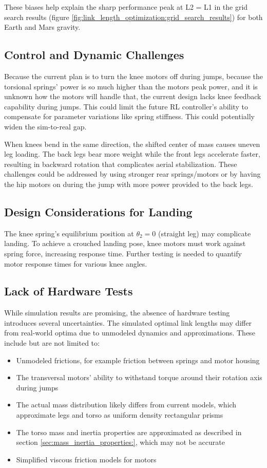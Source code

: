These biases help explain the sharp performance peak at L2 = L1 in the grid search results (figure \ref{fig:link_length_optimization:grid_search_results}) for both Earth and Mars gravity.

\subsection{Control and Dynamic Challenges}
Because the current plan is to turn the knee motors off during jumps, because the torsional springs' power is so much higher than the motors peak power, and it is unknown how the motors will handle that, the current design lacks knee feedback capability during jumps. This could limit the future RL controller's ability to compensate for parameter variations like spring stiffness. This could potentially widen the sim-to-real gap.

When knees bend in the same direction, the shifted center of mass causes uneven leg loading. The back legs bear more weight while the front legs accelerate faster, resulting in backward rotation that complicates aerial stabilization. These challenges could be addressed by using stronger rear springs/motors or by having the hip motors on during the jump with more power provided to the back legs.

\subsection{Design Considerations for Landing}
The knee spring's equilibrium position at $\theta_2=0$ (straight leg) may complicate landing. To achieve a crouched landing pose, knee motors must work against spring force, increasing response time. Further testing is needed to quantify motor response times for various knee angles.

\subsection{Lack of Hardware Tests}
While simulation results are promising, the absence of hardware testing introduces several uncertainties. The simulated optimal link lengths may differ from real-world optima due to unmodeled dynamics and approximations. These include but are not limited to: 
\begin{itemize}
    \item Unmodeled frictions, for example friction between springs and motor housing
    \item The transversal motors' ability to withstand torque around their rotation axis during jumps
    \item The actual mass distribution likely differs from current models, which approximate legs and torso as uniform density rectangular prisms
    \item The torso mass and inertia properties are approximated as described in section \ref{sec:mass_inertia_properties:}, which may not be accurate
    \item Simplified viscous friction models for motors
\end{itemize}


